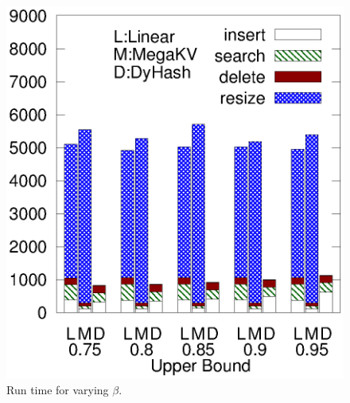 \begin{figure}[htp]
\begin{minipage}{0.19\linewidth}
		\centerline{\dsali}
	\end{minipage}
	\begin{minipage}{0.19\linewidth}\centering
		\includegraphics[width=\linewidth]{pic/dynamic/random/diff_upper.eps}
		\centerline{\dsrandom}
	\end{minipage}
	\caption{Run time for varying $\beta$.}
	\label{fig:vary-beta}
\end{figure}
